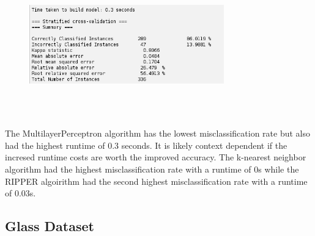 \documentclass{article}
\begin{document}
\begin{enumerate}[label = (\alph*), left=10pt, itemsep=10pt]
\begin{minipage}[t]{0.9\textwidth}
\begin{figure}[H]
                \includegraphics[width=0.75\textwidth, height=0.2\textheight]{./81e.png}
            \end{figure}
        \end{minipage}\\
        \vspace*{10pt}\\
        \begin{minipage}[t]{0.9\textwidth}
            The MultilayerPerceptron algorithm has the lowest misclassification rate but also had the highest runtime of 0.3 seconds. It is 
            likely context dependent if the incresed runtime costs are worth the improved accuracy. The k-nearest neighbor algorithm had the
            highest misclassification rate with a runtime of 0s while the RIPPER algoirithm had the second highest misclassification rate
            with a runtime of 0.03s.
        \end{minipage}
    \end{enumerate}

    \subsection*{Glass Dataset}
    
\end{document}
